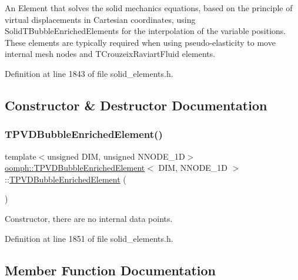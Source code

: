 An Element that solves the solid mechanics equations, based on the principle of virtual displacements in Cartesian coordinates, using Solid\+T\+Bubble\+Enriched\+Elements for the interpolation of the variable positions. These elements are typically required when using pseudo-\/elasticity to move internal mesh nodes and T\+Crouzeix\+Raviart\+Fluid elements. 

Definition at line 1843 of file solid\+\_\+elements.\+h.



\subsection{Constructor \& Destructor Documentation}
\mbox{\label{classoomph_1_1TPVDBubbleEnrichedElement_a79f95cdb37f60a18bd00cdcc11f3963e}} 
\subsubsection{\texorpdfstring{T\+P\+V\+D\+Bubble\+Enriched\+Element()}{TPVDBubbleEnrichedElement()}}
{\footnotesize\ttfamily template$<$unsigned D\+IM, unsigned N\+N\+O\+D\+E\+\_\+1D$>$ \\
\hyperlink{classoomph_1_1TPVDBubbleEnrichedElement}{oomph\+::\+T\+P\+V\+D\+Bubble\+Enriched\+Element}$<$ D\+IM, N\+N\+O\+D\+E\+\_\+1D $>$\+::\hyperlink{classoomph_1_1TPVDBubbleEnrichedElement}{T\+P\+V\+D\+Bubble\+Enriched\+Element} (\begin{DoxyParamCaption}{ }\end{DoxyParamCaption})\hspace{0.3cm}{\ttfamily [inline]}}



Constructor, there are no internal data points. 



Definition at line 1851 of file solid\+\_\+elements.\+h.



\subsection{Member Function Documentation}
\mbox{\label{classoomph_1_1TPVDBubbleEnrichedElement_a7ce226afdc77f8ea5aa300b8026e4809}} 
